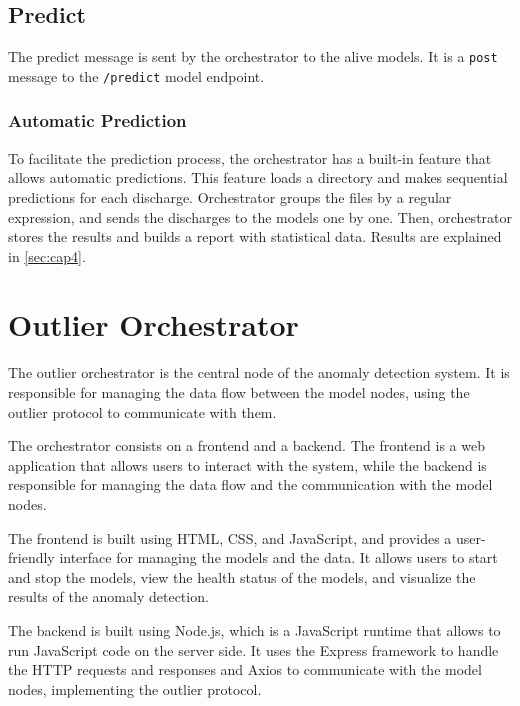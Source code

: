 \subsection{Predict}
The predict message is sent by the orchestrator to the alive models. It is a \texttt{post} message to the \texttt{/predict} model endpoint.

\subsubsection{Automatic Prediction}

To facilitate the prediction process, the orchestrator has a built-in feature that allows automatic predictions. This feature loads a directory and makes sequential predictions for each discharge. Orchestrator groups the files by a regular expression, and sends the discharges to the models one by one. Then, orchestrator stores the results and builds a report with statistical data. Results are explained in \autoref{sec:cap4}. 


\section{Outlier Orchestrator}

The outlier orchestrator is the central node of the anomaly detection system. It is responsible for managing the data flow between the model nodes, using the outlier protocol to communicate with them. 

The orchestrator consists on a frontend and a backend. The frontend is a web application that allows users to interact with the system, while the backend is responsible for managing the data flow and the communication with the model nodes.

The frontend is built using HTML, CSS, and JavaScript, and provides a user-friendly interface for managing the models and the data. It allows users to start and stop the models, view the health status of the models, and visualize the results of the anomaly detection.

The backend is built using Node.js, which is a JavaScript runtime that allows to run JavaScript code on the server side. It uses the Express framework to handle the HTTP requests and responses and Axios to communicate with the model nodes, implementing the outlier protocol.

